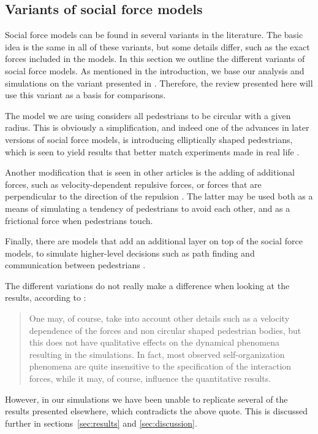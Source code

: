 \subsection{Variants of social force models}
Social force models can be found in several variants in the literature. The 
basic idea is the same in all of these variants, but some details differ, such 
as the exact forces included in the models. In this section we outline the 
different variants of social force models. As mentioned in the introduction, 
we base our analysis and simulations on the variant presented in 
\cite{self-org}. Therefore, the review presented here will use this variant as 
a basis for comparisons.

The model we are using considers all pedestrians to be circular with a given 
radius. This is obviously a simplification, and indeed one of the advances in 
later versions of social force models, is introducing elliptically shaped 
pedestrians, which is seen to yield results that better match experiments made 
in real life \cite{ABconstant}.

Another modification that is seen in other articles is the adding of 
additional forces, such as velocity-dependent repulsive forces, or forces that 
are perpendicular to the direction of the repulsion 
\cite{helbing00,ABconstant}. The latter may be used 
both as a means of simulating a tendency of pedestrians to avoid each other, 
and as a frictional force when pedestrians touch.

Finally, there are models that add an additional layer on top of the social 
force models, to simulate higher-level decisions such as path finding and 
communication between pedestrians \cite{HiDAC}.


The different variations do not really make a difference when looking at the 
results, according to \cite{self-org}:

\begin{quote}
    One may, of course, take into account other details such as a velocity 
    dependence of the forces and non circular shaped pedestrian bodies, but 
    this does not have qualitative effects on the dynamical phenomena 
    resulting in the simulations. In fact, most observed self-organization 
    phenomena are quite insensitive to the specification of the interaction 
    forces, while it may, of course, influence the quantitative results.
\end{quote}

However, in our simulations we have been unable to replicate several of the 
results presented elsewhere, which contradicts the above quote. This is 
discussed further in sections~\ref{sec:results} and \ref{sec:discussion}.


